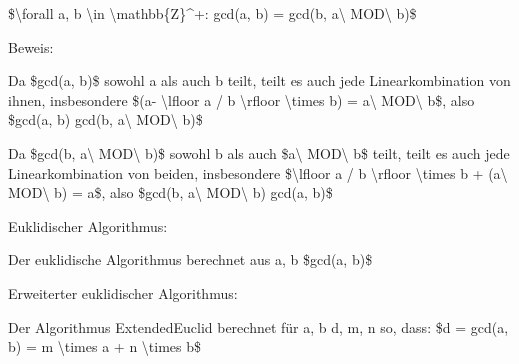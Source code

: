 \documentclass[a4paper]{article}
\begin{document}
\begin{multicols}{3}
\begin{itemize*}
            \begin{itemize*}
                  \item \$\textbackslash forall a, b \textbackslash in \textbackslash mathbb\{Z\}\^{}+: gcd(a, b) = gcd(b, a\textbackslash{} MOD\textbackslash{} b)\$
                  \item Beweis:
                  \begin{itemize*} \item Da \$gcd(a, b)\$ sowohl a als auch b teilt, teilt es auch jede Linearkombination von ihnen, insbesondere \$(a- \textbackslash lfloor a / b \textbackslash rfloor \textbackslash times b) = a\textbackslash{} MOD\textbackslash{} b\$, also \$gcd(a, b) \textbar{} gcd(b, a\textbackslash{} MOD\textbackslash{} b)\$ \item Da \$gcd(b, a\textbackslash{} MOD\textbackslash{} b)\$ sowohl b als auch \$a\textbackslash{} MOD\textbackslash{} b\$ teilt, teilt es auch jede Linearkombination von beiden, insbesondere \$\textbackslash lfloor a / b \textbackslash rfloor \textbackslash times b + (a\textbackslash{} MOD\textbackslash{} b) = a\$, also \$gcd(b, a\textbackslash{} MOD\textbackslash{} b) \textbar{} gcd(a, b)\$ \end{itemize*}
            \end{itemize*}
            \item
            Euklidischer Algorithmus:

            \begin{itemize*}
                  \item Der euklidische Algorithmus berechnet aus a, b \$gcd(a, b)\$
            \end{itemize*}

            \item
            Erweiterter euklidischer Algorithmus:

            \begin{itemize*}
                  \item Der Algorithmus ExtendedEuclid berechnet für a, b d, m, n so, dass: \$d = gcd(a, b) = m \textbackslash times a + n \textbackslash times b\$
            \end{itemize*}


\end{itemize*}
\end{multicols}
\end{document}
